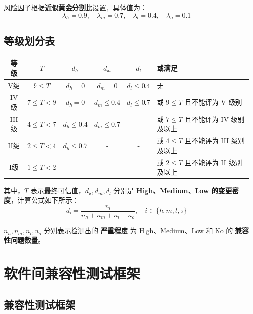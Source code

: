 \documentclass[14pt,a4paper,UTF8,twoside]{article}
\begin{document}
\noindent 风险因子根据\textbf{近似黄金分割比}设置，具体值为：
\[
\lambda_h = 0.9, \quad \lambda_m = 0.7, \quad \lambda_l = 0.4, \quad \lambda_o = 0.1 \tag{4}
\]

\subsection{等级划分表}

\begin{table}[H]
    \centering
    \renewcommand{\arraystretch}{1.2}
    \begin{tabular}{|c|c|c|c|c|l|}
    \hline
    \textbf{等级} & \boldmath$T$ & \boldmath$d_h$ & \boldmath$d_m$ & \boldmath$d_l$ & \textbf{或满足} \\ \hline
    V级  & $9 \leq T$      & $d_h = 0$     & $d_m = 0$     & $d_l \leq 0.4$  & 无               \\ \hline
    IV级 & $7 \leq T < 9$  & $d_h = 0$     & $d_m \leq 0.4$& $d_l \leq 0.7$  & 或 $9 \leq T$ 且不能评为 V 级别 \\ \hline
    III级 & $4 \leq T < 7$  & $d_h \leq 0.4$& $d_m \leq 0.7$& -               & 或 $7 \leq T$ 且不能评为 IV 级别及以上 \\ \hline
    II级  & $2 \leq T < 4$  & $d_h \leq 0.7$& -             & -               & 或 $4 \leq T$ 且不能评为 III 级别及以上 \\ \hline
    I级   & $1 \leq T < 2$  & -             & -             & -               & 或 $2 \leq T$ 且不能评为 II 级别及以上 \\ \hline
    \end{tabular}
\end{table}
    
\noindent 其中，\( T \) 表示最终可信值，\( d_h, d_m, d_l \) 分别是 \textbf{High、Medium、Low 的变更密度}，计算公式如下所示：
\[
d_i = \frac{n_i}{n_h + n_m + n_l + n_o}, \quad i \in \{h, m, l, o\} \tag{5}
\]

\noindent \( n_h, n_m, n_l, n_o \) 分别表示检测出的 \textbf{严重程度} 为 High、Medium、Low 和 No 的 \textbf{兼容性问题数量}。

    
\section{软件间兼容性测试框架}


\newpage{}

\subsection{兼容性测试框架}
\end{document}

